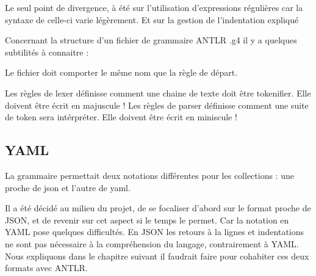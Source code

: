 \documentclass[
    iict, %
    il, %
]{heig-tb}
\begin{document}
Le seul point de divergence, à été sur l'utilisation d'expressions régulières car la syntaxe de celle-ci varie légèrement. Et sur la gestion de l'indentation expliqué %

Concernant la structure d'un fichier de grammaire ANTLR .g4 il y a quelques subtilités à connaitre :

Le fichier doit comporter le même nom que la règle de départ. %

Les règles de lexer définisse comment une chaine de texte doit être tokenifier. Elle doivent être écrit en majuscule !
Les règles de parser définisse comment une suite de token sera intérpréter. Elle doivent être écrit en miniscule !







\subsection{YAML}
La grammaire permettait deux notations différentes pour les collections : une proche de json et l'autre de yaml.


Il a été décidé au milieu du projet, de se focaliser d'abord sur le format proche de JSON, et de revenir sur cet aspect si le temps le permet.
Car la notation en YAML pose quelques difficultés. %
En JSON les retours à la lignes et indentations ne sont pas nécessaire à la compréhension du langage, contrairement à YAML.
Nous expliquons dans le chapitre suivant il faudrait faire pour cohabiter ces deux formats avec ANTLR. %
\end{document}

